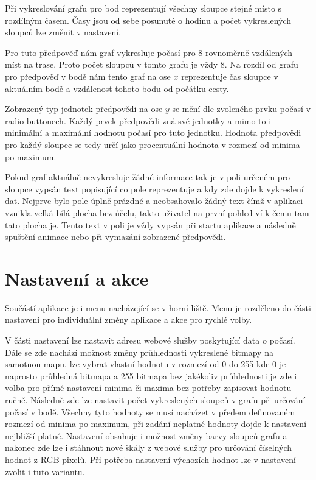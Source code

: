 \documentclass[czech,bachelor,dept460,male,csharp,cpdeclaration]{diploma}
\begin{document}
	Při vykreslování grafu pro bod reprezentují všechny sloupce stejné místo s rozdílným časem. Časy jsou od sebe posunuté o hodinu a počet vykreslených sloupců lze změnit v nastavení.
	
	Pro tuto předpověď nám graf vykresluje počasí pro 8 rovnoměrně vzdálených míst na trase. Proto počet sloupců v tomto grafu je vždy 8. Na rozdíl od grafu pro předpověď v bodě nám tento graf na ose $x$ reprezentuje čas sloupce v aktuálním bodě a vzdálenost tohoto bodu od počátku cesty.
	
	Zobrazený typ jednotek předpovědi na ose $y$ se mění dle zvoleného prvku počasí v radio buttonech. Každý prvek předpovědi zná své jednotky a mimo to i minimální a maximální hodnotu počasí pro tuto jednotku. Hodnota předpovědi pro každý sloupec se tedy určí jako procentuální hodnota v rozmezí od minima po maximum.
	
	Pokud graf aktuálně nevykresluje žádné informace tak je v poli určeném pro sloupce vypsán text popisující co pole reprezentuje a kdy zde dojde k vykreslení dat. Nejprve bylo pole úplně prázdné a neobsahovalo žádný text čímž v aplikaci vznikla velká bílá plocha bez účelu, takto uživatel na první pohled ví k čemu tam tato plocha je. Tento text v poli je vždy vypsán při startu aplikace a následně spuštění animace nebo při vymazání zobrazené předpovědi.
	
	\section{Nastavení a akce}
	
	Součástí aplikace je i menu nacházející se v horní liště. Menu je rozděleno do části nastavení pro individuální změny aplikace a akce pro rychlé volby.
	
	V části nastavení lze nastavit adresu webové služby poskytující data o počasí. Dále se zde nachází možnost změny průhlednosti vykreslené bitmapy na samotnou mapu, lze vybrat vlastní hodnotu v rozmezí od 0 do 255 kde 0 je naprosto průhledná bitmapa a 255 bitmapa bez jakékoliv průhlednosti je zde i volba pro přímé nastavení minima či maxima bez potřeby zapisovat hodnotu ručně. Následně zde lze nastavit počet vykreslených sloupců v grafu při určování počasí v bodě. Všechny tyto hodnoty se musí nacházet v předem definovaném rozmezí od minima po maximum, při zadání neplatné hodnoty dojde k nastavení nejbližší platné. Nastavení obsahuje i možnost změny barvy sloupců grafu a nakonec zde lze i stáhnout nové škály z webové služby pro určování číselných hodnot z RGB pixelů. Při potřeba nastavení výchozích hodnot lze v nastavení zvolit i tuto variantu.
	
\end{document}
